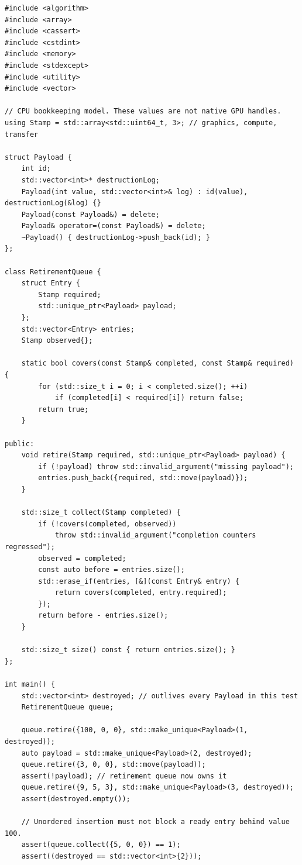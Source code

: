 \begin{verbatim}
#include <algorithm>
#include <array>
#include <cassert>
#include <cstdint>
#include <memory>
#include <stdexcept>
#include <utility>
#include <vector>

// CPU bookkeeping model. These values are not native GPU handles.
using Stamp = std::array<std::uint64_t, 3>; // graphics, compute, transfer

struct Payload {
    int id;
    std::vector<int>* destructionLog;
    Payload(int value, std::vector<int>& log) : id(value), destructionLog(&log) {}
    Payload(const Payload&) = delete;
    Payload& operator=(const Payload&) = delete;
    ~Payload() { destructionLog->push_back(id); }
};

class RetirementQueue {
    struct Entry {
        Stamp required;
        std::unique_ptr<Payload> payload;
    };
    std::vector<Entry> entries;
    Stamp observed{};

    static bool covers(const Stamp& completed, const Stamp& required) {
        for (std::size_t i = 0; i < completed.size(); ++i)
            if (completed[i] < required[i]) return false;
        return true;
    }

public:
    void retire(Stamp required, std::unique_ptr<Payload> payload) {
        if (!payload) throw std::invalid_argument("missing payload");
        entries.push_back({required, std::move(payload)});
    }

    std::size_t collect(Stamp completed) {
        if (!covers(completed, observed))
            throw std::invalid_argument("completion counters regressed");
        observed = completed;
        const auto before = entries.size();
        std::erase_if(entries, [&](const Entry& entry) {
            return covers(completed, entry.required);
        });
        return before - entries.size();
    }

    std::size_t size() const { return entries.size(); }
};

int main() {
    std::vector<int> destroyed; // outlives every Payload in this test
    RetirementQueue queue;

    queue.retire({100, 0, 0}, std::make_unique<Payload>(1, destroyed));
    auto payload = std::make_unique<Payload>(2, destroyed);
    queue.retire({3, 0, 0}, std::move(payload));
    assert(!payload); // retirement queue now owns it
    queue.retire({9, 5, 3}, std::make_unique<Payload>(3, destroyed));
    assert(destroyed.empty());

    // Unordered insertion must not block a ready entry behind value 100.
    assert(queue.collect({5, 0, 0}) == 1);
    assert((destroyed == std::vector<int>{2}));


\end{verbatim}
